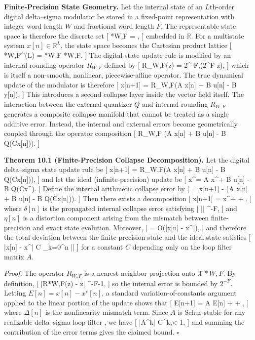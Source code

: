 \medskip

\textbf{Finite-Precision State Geometry.}
Let the internal state of an $L$th-order digital delta–sigma modulator be stored in a fixed-point representation with integer word length $W$ and fractional word length $F$. The representable state space is therefore the discrete set
[
*{W,F} = ,
]
embedded in $\mathbb{R}$. For a multistate system $x[n] \in \mathbb{R}^{L}$, the state space becomes the Cartesian product lattice
[
*{W,F}^{(L)} = *{W,F} \times \cdots \times {}*{W,F}.
]
The digital state update rule is modified by an internal rounding operator $R_{W,F}$ defined by
[
R_{W,F}(z) = 2^{-F},(2^{F} z),
]
which is itself a non-smooth, nonlinear, piecewise-affine operator. The true dynamical update of the modulator is therefore
[
x[n+1] = R_{W,F}(A x[n] + B u[n] - B y[n]).
]
This introduces a second collapse layer inside the vector field itself. The interaction between the external quantizer $Q$ and internal rounding $R_{W,F}$ generates a composite collapse manifold that cannot be treated as a single additive error. Instead, the internal and external errors become geometrically coupled through the operator composition
[
R_{W,F} \circ (A x[n] + B u[n] - B Q(Cx[n])).
]

\medskip

\textbf{Theorem 10.1 (Finite-Precision Collapse Decomposition).}
Let the digital delta–sigma state update rule be
[
x[n+1] = R_{W,F}(A x[n] + B u[n] - B Q(Cx[n])),
]
and let the ideal (infinite-precision) update be
[
x^\star[n+1] = A x^\star[n] + B u[n] - B Q(Cx^\star[n]).
]
Define the internal arithmetic collapse error by
[
\epsilon[n] = x[n+1] - (A x[n] + B u[n] - B Q(Cx[n])).
]
Then there exists a decomposition
[
x[n+1] = x^\star[n+1] + \delta[n] + \eta[n],
]
where $\delta[n]$ is the propagated internal collapse error satisfying
[
|\delta[n]| ^{-F},
]
and $\eta[n]$ is a distortion component arising from the mismatch between finite-precision and exact state evolution. Moreover,
[
\eta[n] = O(|x[n] - x^\star[n]|),
]
and therefore the total deviation between the finite-precision state and the ideal state satisfies
[
|x[n] - x^\star[n]| \le C \sum_{k=0}^{n} |\epsilon[k]|
]
for a constant $C$ depending only on the loop filter matrix $A$.

\textit{Proof.}
The operator $R_{W,F}$ is a nearest-neighbor projection onto $\mathcal{X}*{W,F}$. By definition,
[
|R*{W,F}(z) - z| ^{-F-1},
]
so the internal error is bounded by $2^{-F}$. Letting $E[n] = x[n] - x^\star[n]$, a standard variation-of-constants argument applied to the linear portion of the update shows that
[
E[n+1] = A E[n] + \epsilon[n] + \Delta[n],
]
where $\Delta[n]$ is the nonlinearity mismatch term. Since $A$ is Schur-stable for any realizable delta–sigma loop filter \cite{schreier2005deltasigma}, we have
[
|A^k| \le C\lambda^k,\qquad \lambda < 1,
]
and summing the contribution of the error terms gives the claimed bound. \hfill $\square$

